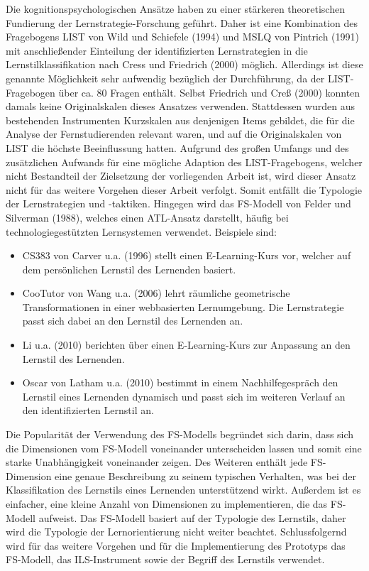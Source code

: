     Die kognitionspsychologischen Ansätze haben zu einer stärkeren theoretischen Fundierung der Lernstrategie-Forschung geführt. \parencite[13]{Martin.2012}
    Daher ist eine Kombination des Fragebogens LIST von Wild und Schiefele (1994) und MSLQ von Pintrich (1991) mit anschließender Einteilung der identifizierten Lernstrategien in die Lernstilklassifikation
    nach Cress und Friedrich (2000) möglich. Allerdings ist diese genannte Möglichkeit sehr aufwendig bezüglich der Durchführung, 
    da der LIST-Fragebogen über ca. 80 Fragen enthält. Selbst 
    Friedrich und Creß (2000) konnten damals keine Originalskalen dieses Ansatzes verwenden. Stattdessen wurden aus bestehenden Instrumenten Kurzskalen aus denjenigen Items gebildet, die für die Analyse der Fernstudierenden relevant waren, und 
    auf die Originalskalen von LIST die höchste Beeinflussung hatten.
    Aufgrund des großen Umfangs und des zusätzlichen Aufwands für eine mögliche Adaption des LIST-Fragebogens, welcher nicht Bestandteil der Zielsetzung der vorliegenden Arbeit ist, 
    wird dieser Ansatz nicht für das weitere Vorgehen dieser Arbeit verfolgt. Somit entfällt die Typologie der Lernstrategien und -taktiken.
    Hingegen wird das FS-Modell von Felder und Silverman (1988), welches einen ATL-Ansatz darstellt, häufig bei technologiegestützten Lernsystemen verwendet. \parencite[866]{Funda.2009}
    Beispiele sind: 
    \begin{itemize}
        \item CS383 von Carver u.a. (1996) stellt einen E-Learning-Kurs vor, welcher auf dem persönlichen Lernstil des Lernenden basiert. \nocite{Carver.1996}
        \item CooTutor von Wang u.a. (2006) lehrt räumliche geometrische Transformationen in einer webbasierten Lernumgebung. Die Lernstrategie passt sich dabei an den Lernstil des Lernenden an. \nocite{Wang.2006}
        \item Li u.a. (2010) berichten über einen E-Learning-Kurs zur Anpassung an den Lernstil des Lernenden. \nocite{Li.2010}
        \item Oscar von Latham u.a. (2010) bestimmt in einem Nachhilfegespräch den Lernstil eines Lernenden dynamisch und passt sich im weiteren Verlauf an den identifizierten Lernstil an. %
    \end{itemize} 

    Die Popularität der Verwendung des FS-Modells begründet sich darin, dass sich
    die Dimensionen vom FS-Modell voneinander unterscheiden lassen und somit eine starke Unabhängigkeit voneinander zeigen.
    Des Weiteren enthält jede FS-Dimension eine genaue Beschreibung zu seinem typischen Verhalten, was
    bei der Klassifikation des Lernstils eines Lernenden unterstützend wirkt. 
    Außerdem ist es einfacher, eine kleine Anzahl von Dimensionen zu implementieren, die das FS-Modell aufweist. \parencite[14]{Latham.2011}
    Das FS-Modell basiert auf der Typologie des Lernstils, daher wird die Typologie der Lernorientierung nicht weiter beachtet.
    Schlussfolgernd wird für das weitere Vorgehen und für die Implementierung des Prototyps das FS-Modell, das ILS-Instrument sowie der Begriff des Lernstils verwendet.

